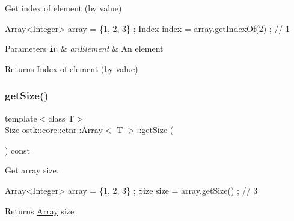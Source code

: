 Get index of element (by value) 


\begin{DoxyCode}
Array<Integer> array = \{1, 2, 3\} ;
\hyperlink{namespaceostk_1_1core_1_1types_a6e63c1b15b2e5bc87a43771c09fa913a}{Index} index = array.getIndexOf(2) ; \textcolor{comment}{// 1}
\end{DoxyCode}



\begin{DoxyParams}[1]{Parameters}
\mbox{\tt in}  & {\em an\+Element} & An element \\
\hline
\end{DoxyParams}
\begin{DoxyReturn}{Returns}
Index of element (by value) 
\end{DoxyReturn}
\mbox{\label{classostk_1_1core_1_1ctnr_1_1_array_a42e093c2f11de1c7a96ebd0ee6262c63}} 
\subsubsection{\texorpdfstring{get\+Size()}{getSize()}}
{\footnotesize\ttfamily template$<$class T$>$ \\
Size \hyperlink{classostk_1_1core_1_1ctnr_1_1_array}{ostk\+::core\+::ctnr\+::\+Array}$<$ T $>$\+::get\+Size (\begin{DoxyParamCaption}{ }\end{DoxyParamCaption}) const}



Get array size. 


\begin{DoxyCode}
Array<Integer> array = \{1, 2, 3\} ;
\hyperlink{namespaceostk_1_1core_1_1types_acf68f214a245e35a7c1994c84dc56746}{Size} size = array.getSize() ; \textcolor{comment}{// 3}
\end{DoxyCode}


\begin{DoxyReturn}{Returns}
\hyperlink{classostk_1_1core_1_1ctnr_1_1_array}{Array} size 
\end{DoxyReturn}
\mbox{\label{classostk_1_1core_1_1ctnr_1_1_array_adc03cfa862d43df7734e69f685534bf1}} 
